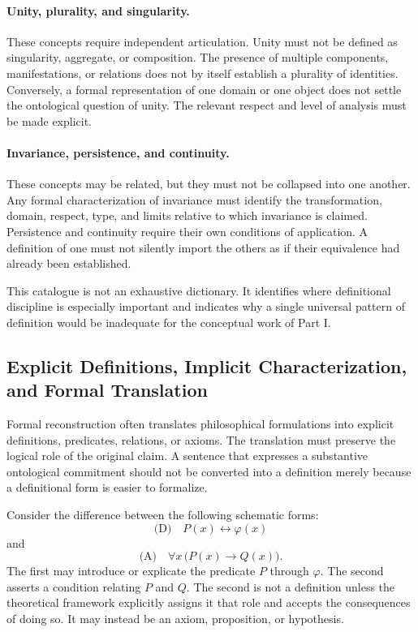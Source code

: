 \paragraph{Unity, plurality, and singularity.}

These concepts require independent articulation. Unity must not
be defined as singularity, aggregate, or composition. The presence
of multiple components, manifestations, or relations does not
by itself establish a plurality of identities. Conversely, a
formal representation of one domain or one object does not settle
the ontological question of unity. The relevant respect and level
of analysis must be made explicit.

\paragraph{Invariance, persistence, and continuity.}

These concepts may be related, but they must not be collapsed
into one another. Any formal characterization of invariance must
identify the transformation, domain, respect, type, and limits
relative to which invariance is claimed. Persistence and continuity
require their own conditions of application. A definition of one
must not silently import the others as if their equivalence had
already been established.

This catalogue is not an exhaustive dictionary. It identifies
where definitional discipline is especially important and indicates
why a single universal pattern of definition would be inadequate
for the conceptual work of Part I.

\subsection{Explicit Definitions, Implicit Characterization, and Formal Translation}

Formal reconstruction often translates philosophical formulations
into explicit definitions, predicates, relations, or axioms. The
translation must preserve the logical role of the original claim.
A sentence that expresses a substantive ontological commitment
should not be converted into a definition merely because a
definitional form is easier to formalize.

Consider the difference between the following schematic forms:
\[
  \text{(D)} \quad P(x) \leftrightarrow \varphi(x)
\]
and
\[
  \text{(A)} \quad \forall x\,\bigl(P(x) \rightarrow Q(x)\bigr).
\]
The first may introduce or explicate the predicate \(P\) through
\(\varphi\). The second asserts a condition relating \(P\) and
\(Q\). The second is not a definition unless the theoretical
framework explicitly assigns it that role and accepts the
consequences of doing so. It may instead be an axiom, proposition,
or hypothesis.

